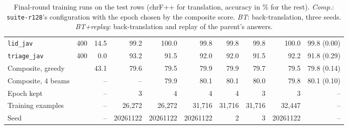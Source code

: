 \documentclass[11pt]{article}
\newcommand{\run}[1]{\texttt{#1}}
\begin{document}
\begin{table}[t]
\begin{tabular}{lrrrrrrrrr}
\texttt{lid\_jav} & 400 & 14.5 & 99.2 & 100.0 & 99.8 & 99.8 & 99.8 & 100.0 & 99.8 (0.00) \\
\texttt{triage\_jav} & 400 & 0.0 & 93.2 & 91.5 & 92.0 & 92.0 & 91.5 & 92.2 & 91.8 (0.29) \\
\midrule
Composite, greedy & & 43.1 & 79.6 & 79.5 & 79.9 & 79.9 & 79.7 & 79.5 & 79.8 (0.14) \\
Composite, 4 beams & & -- & -- & 79.9 & 80.1 & 80.1 & 80.0 & 79.8 & 80.1 (0.10) \\
Epoch kept & & -- & 3 & 4 & 4 & 4 & 3 & 3 & -- \\
Training examples & & -- & 26,272 & 26,272 & 31,716 & 31,716 & 31,716 & 32,447 & -- \\
Seed & & -- & 20261122 & 20261122 & 20261122 & 2 & 3 & 20261122 & -- \\
\bottomrule
\end{tabular}
\caption{Final-round training runs on the test rows (chrF++ for translation, accuracy in \% for the rest).
\emph{Comp.}: \run{suite-r128}'s configuration with the epoch chosen by the composite score. \emph{BT}:
back-translation, three seeds. \emph{BT+replay}: back-translation and replay of the parent's answers.}
\label{tab:final-runs}
\end{table}
\end{document}
